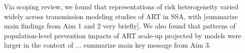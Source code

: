 
Via scoping review, we found that representations of risk heterogeneity varied widely across transmission modeling studies of ART in SSA, with [summarize main findings from Aim 1 and 2 very briefly].
We also found that patterns of population-level prevention impacts of ART scale-up projected by models were larger in the context of ... summarize main key message from Aim 3.
